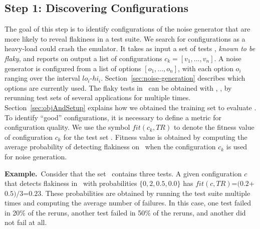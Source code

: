 \documentclass[conference]{IEEEtran}
\begin{document}



\subsection{Step 1: Discovering Configurations}
\label{technique:discovering-configurations}

The goal of this step is to identify configurations of the noise generator that are more likely to reveal flakiness in a test suite. We search for configurations as a heavy-load could crash the emulator. It takes as input a set of tests \tr, \emph{known to be flaky}, and reports on output a list of configurations $c_k=[v_1,..., v_n]$. A noise generator is configured from a list of options $[o_1,...,o_n]$, with each option $o_i$ ranging over the interval $lo_i$-$hi_i$. Section~\ref{sec:noise-generation} describes which options are currently used. The flaky tests in \tr\ can be obtained with \rerun{}, \ie{}, by rerunning test sets of several applications for multiple times. Section~\ref{sec:objAndSetup} explains how we obtained the training set to evaluate \tname. To identify ``good'' configurations, it is necessary to define a metric for configuration quality. We use the symbol $\mathit{fit(c_k, \mathit{TR})}$ to denote the fitness value of configuration $c_k$ for the test set \tr. Fitness value is obtained by computing the average probability of detecting flakiness on \tr\ when the configuration $c_k$ is used for noise generation. 

\vspace{1ex}\noindent\textbf{Example.}~Consider that the set \tr\ contains three tests. A given configuration $c$ that detects flakiness in \tr\ with probabilities $\{0,2, 0.5, 0.0\}$ has $\mathit{fit}(c, \mathit{TR})$=$(0.2$+$0.5)/3$=$0.23$. These probabilities are obtained by running the test suite multiple times and computing the average number of failures. In this case, one test failed in 20\% of the reruns, another test failed in 50\% of the reruns, and another did not fail at all.
\end{document}
